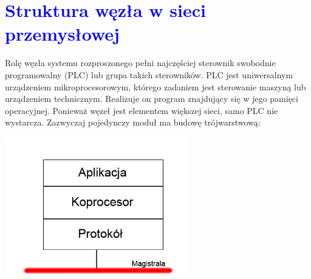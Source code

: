 \documentclass[a4paper,twoside]{article}
\begin{document}
\section{\textcolor{blue}{Struktura węzła w sieci przemysłowej}}
Rolę węzła systemu rozproszonego pełni najczęściej sterownik swobodnie programowalny (PLC) lub grupa takich sterowników. PLC jest uniwersalnym urządzeniem mikroprocesorowym, którego zadaniem jest sterowanie maszyną lub urządzeniem technicznym. Realizuje on program znajdujący się w jego pamięci operacyjnej. Ponieważ węzeł jest elementem większej sieci, samo PLC nie wystarcza. Zazwyczaj pojedynczy moduł ma budowę trójwarstwową: \\

\begin{center}
	\includegraphics[width=8cm]{./img/wezel.jpg}
\end{center}
\end{document}
